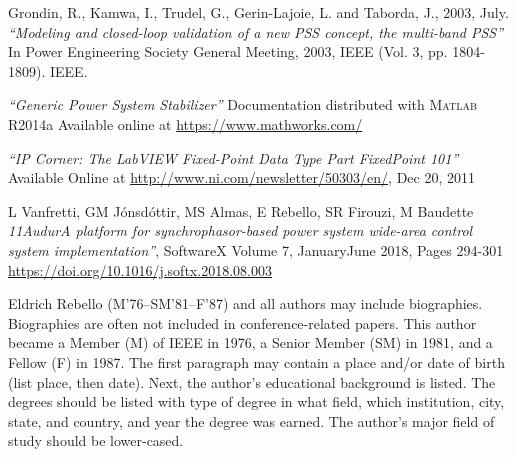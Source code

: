 \documentclass{ieeeaccess}
\begin{document}
\begin{thebibliography}{00}
 Grondin, R., Kamwa, I., Trudel, G., Gerin-Lajoie, L. and Taborda, J., 2003, July. \emph{``Modeling and closed-loop validation of a new PSS concept, the multi-band PSS''} In Power Engineering Society General Meeting, 2003, IEEE (Vol. 3, pp. 1804-1809). IEEE.

 \emph{``Generic Power System Stabilizer''} Documentation distributed with \textsc{Matlab} R2014a Available online at \underline{https://www.mathworks.com/}

 \emph{``IP Corner: The LabVIEW Fixed-Point Data Type Part Fixed\textendash Point 101''} Available Online at \underline{http://www.ni.com/newsletter/50303/en/}, Dec 20, 2011 

 L Vanfretti, GM J\'{o}nsd\'{o}ttir, MS Almas, E Rebello, SR Firouzi, M Baudette \emph{11Audur\textendash A platform for synchrophasor-based power system wide-area control system implementation''}, SoftwareX Volume 7, January\textendash June 2018, Pages 294-301 \underline{https://doi.org/10.1016/j.softx.2018.08.003}

\end{thebibliography}

\begin{IEEEbiography}{Eldrich Rebello} (M'76--SM'81--F'87) and all authors may include 
biographies. Biographies are often not included in conference-related
papers. This author became a Member (M) of IEEE in 1976, a Senior
Member (SM) in 1981, and a Fellow (F) in 1987. The first paragraph may
contain a place and/or date of birth (list place, then date). Next,
the author's educational background is listed. The degrees should be
listed with type of degree in what field, which institution, city,
state, and country, and year the degree was earned. The author's major
field of study should be lower-cased. 
\end{IEEEbiography}
\end{document}
